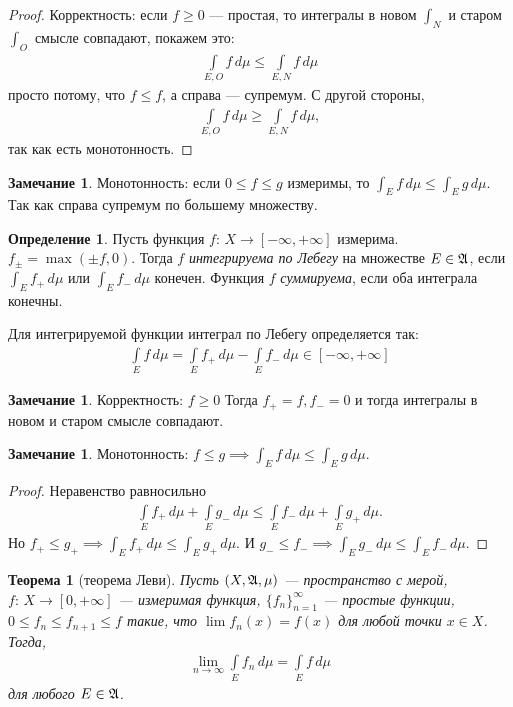 \documentclass[a4paper,14pt]{extarticle}
\newcounter{theoremCnt}
\theoremstyle{definition}
\newtheorem{df}[theoremCnt]{Определение}
\theoremstyle{plain}
\newtheorem{thm}[theoremCnt]{Теорема}
\theoremstyle{plain}
\theoremstyle{plain}
\theoremstyle{plain}
\theoremstyle{definition}
\theoremstyle{definition}
\newtheorem{remrk}[theoremCnt]{Замечание}
\theoremstyle{definition}
\theoremstyle{definition}
\theoremstyle{definition}
\theoremstyle{definition}
\theoremstyle{plain}
\theoremstyle{plain}
\theoremstyle{plain}
\theoremstyle{plain}
\theoremstyle{definition}
\theoremstyle{definition}
\theoremstyle{definition}
\theoremstyle{definition}
\theoremstyle{definition}
\newcommand{\A}{\ensuremath \mathfrak{A}}
\begin{document}
\begin{proof}
 Корректность: если $f \geqslant 0$ --- простая, то интегралы в новом $\int_N$ и старом $\int_O$ смысле совпадают, покажем это:
 \begin{align*}
  \int\limits_{E,O} f \, d\mu \leqslant \int\limits_{E,N} f \, d\mu
 \end{align*} просто потому, что $f \leqslant f$, а справа --- супремум. С другой стороны, \begin{align*}
  \int\limits_{E,O} f \, d\mu \geqslant \int\limits_{E,N} f \, d\mu
,\end{align*} так как есть монотонность.
\end{proof}
\begin{remrk}
 Монотонность: если $0 \leqslant f \leqslant g$ измеримы, то $\int_E f \, d\mu \leqslant 
 \int_E g\,d\mu$. Так как справа супремум по большему множеству.
\end{remrk}
\begin{df}
 Пусть функция $f \colon\, X \to [-\infty,+\infty] $ измерима. $f_{\pm} = \max(\pm f, 0)$. Тогда $f$ \textit{интегрируема по Лебегу} на множестве $E \in \A$, если $\int_E f_+ \, d\mu$  или $\int_E f_- \, d\mu$ конечен. Функция $f$ \textit{суммируема}, если оба интеграла конечны.

 Для интегрируемой функции интеграл по Лебегу определяется так: \begin{align*}
  \int\limits_E f \, d\mu = \int\limits_E f_+ \, d\mu - \int\limits_E f_- \, d\mu \in [-\infty,+\infty]
 \end{align*} 
\end{df}
\begin{remrk}
 Корректность: $f \geqslant 0$ Тогда $f_+= f, f_- = 0$ и тогда интегралы в новом и старом смысле совпадают.
\end{remrk}
\begin{remrk}
 Монотонность: $f \leqslant g \implies \int_E f \, d\mu \leqslant \int_E g \, d\mu$.
\end{remrk}
\begin{proof}
 Неравенство равносильно \begin{align*}
  \int\limits_E f_+ \, d\mu + \int\limits_E g_- \, d\mu \leqslant \int\limits_E f_- \, d\mu + \int\limits_E g_+ \, d\mu
 .\end{align*} Но $f_+ \leqslant g_+ \implies \int_E f_+ \, d\mu \leqslant \int_E g_+ \, d\mu$. И $g_- \leqslant f_- \implies \int_E g_- \, d\mu \leqslant \int_E f_- \, d\mu$.
\end{proof}
\begin{thm}[теорема Леви]
 \label{theorem:levi}
 Пусть $(X, \A, \mu)$ --- пространство с мерой, $f \colon\, X \to [0, +\infty] $ --- измеримая функция, $\{f_{n}\}_{n=1}^{\infty} $ --- простые функции, $0 \leqslant f_n \leqslant f_{n+1} \leqslant f$ такие, что $\lim f_n(x) = f(x)$ для любой точки  $x \in X$. Тогда, \begin{align*}
  \lim\limits_{n \to \infty} \int\limits_E f_n \, d\mu = \int\limits_E f \, d\mu
 \end{align*} для любого $E \in \A$.
\end{thm}
\end{document}
